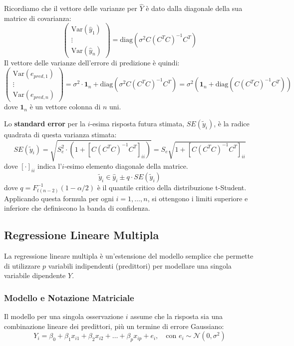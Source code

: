 Ricordiamo che il vettore delle varianze per \(\hat{Y}\) è dato dalla diagonale
della sua matrice di covarianza:
\[
	\begin{pmatrix} \text{Var}(\hat{y}_1) \\ \vdots \\ \text{Var}(\hat{y}_n)
	\end{pmatrix} = \text{diag}\left( \sigma^2 C (C^T C)^{-1} C^T \right)
\]
Il vettore delle varianze dell'errore di predizione è quindi:
\[
	\begin{pmatrix} \text{Var}(e_{pred, 1}) \\ \vdots \\ \text{Var}(e_{pred, n})
	\end{pmatrix} =
	\sigma^2 \cdot \mathbf{1}_n + \text{diag}\left( \sigma^2 C (C^T C)^{-1} C^T
	\right)
	= \sigma^2 \left( \mathbf{1}_n + \text{diag}\left( C (C^T C)^{-1} C^T
	\right) \right)
\]
dove \(\mathbf{1}_n\) è un vettore colonna di \(n\) uni.

Lo \textbf{standard error} per la \(i\)-esima risposta futura stimata,
\(SE(\tilde{y}_i)\), è la radice quadrata di questa varianza stimata:
\[
	SE(\tilde{y}_i) = \sqrt{S_e^2 \cdot \left(1 + \left[ C (C^T C)^{-1} C^T
			\right]_{ii}\right)} = S_e \sqrt{1 + \left[ C (C^T C)^{-1} C^T \right]_{ii}}
\]
dove \([ \cdot ]_{ii}\) indica l'\(i\)-esimo elemento diagonale della matrice.
\[
	\tilde{y}_i \in \hat{y}_i \pm q \cdot SE(\tilde{y}_i)
\]
dove \(q = F_{t(n-2)}^{-1}(1-\alpha/2)\) è il quantile critico della
distribuzione t-Student. Applicando questa formula per ogni \(i=1, \dots, n\),
si ottengono i limiti superiore e inferiore che definiscono la banda di
confidenza.


\subsection{Regressione Lineare Multipla}

La regressione lineare multipla è un'estensione del modello semplice che
permette di utilizzare \(p\) variabili indipendenti (predittori) per modellare
una singola variabile dipendente \(Y\).

\subsubsection{Modello e Notazione Matriciale}

Il modello per una singola osservazione \(i\) assume che la risposta sia una
combinazione lineare dei predittori, più un termine di errore Gaussiano:
\[
	Y_i = \beta_0 + \beta_1 x_{i1} + \beta_2 x_{i2} + \dots + \beta_p x_{ip} +
	e_i, \quad \text{con } e_i \sim \mathcal{N}(0, \sigma^2)
\]


